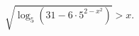 \begin{ex}[type=inequality]
	\begin{condition}
		$ \sqrt{\log_5(31 - 6\cdot5^{2 - x^2})}>x .$
	\end{condition}
\end{ex}